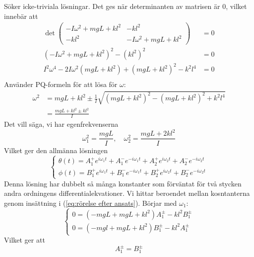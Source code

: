 Söker icke-triviala lösningar. Det ges när determinanten av matrisen är 0, vilket innebär att \begin{align}
    \det \begin{pmatrix}
        -I\omega^2+mgL+kl^2 & -kl^2 \\
        -kl^2  &-I\omega^2+mgL+kl^2 
    \end{pmatrix} &= 0 \\
    (-I\omega^2+mgL+kl^2)^2-(kl^2)^2 &= 0\\
    I^2\omega^4-2I\omega^2(mgL+kl^2)+(mgL+kl^2)^2-k^2l^4 &=0\\
\end{align}
Använder PQ-formeln för att lösa för $\omega$:
\begin{align}
    \omega^2 &= mgL+kl^2 \pm \frac{1}{I}\sqrt{ (mgL+kl^2)^2-(mgL+kl^2)^2 + k^2l^4 }\\
    &= \frac{mgL+kl^2\pm kl^2}{I} 
\end{align}
Det vill säga, vi har egenfrekvenserna \begin{equation}
    \omega_1^2 = \frac{mgL}{I}, \quad  \omega_2^2 = \frac{mgL+2kl^2}{I}
\end{equation}
Vilket ger den allmänna lösningen 
\begin{equation}
    \begin{cases}
        \theta(t) = A_1^+e^{i\omega_1t}+A_1^-e^{-i\omega_1t}+A_2^+e^{i\omega_2t}+A_2^-e^{-i\omega_2t}\\
        \phi(t) = B_1^+e^{i\omega_1t}+B_1^-e^{-i\omega_1t}+B_2^+e^{i\omega_2t}+B_2^-e^{-i\omega_2t}
    \end{cases}
\end{equation}
Denna lösning har dubbelt så många konstanter som förväntat för två stycken andra ordningens differentialekvationer. Vi hittar beroendet mellan kosntanterna genom insättning i (\ref{eq:rörelse efter ansats}). Börjar med $\omega_1$:
\begin{equation}
    \begin{cases}
        0 = (-mgL+mgL+kl^2)A_1^\pm-{kl^2}B_1^\pm \\
        0 = (-mgl+mgL+kl^2)B_1^\pm-{kl^2}A_1^\pm
    \end{cases}
\end{equation}
Vilket ger att \begin{equation}
    A_1^\pm = B_1^\pm
\end{equation}
